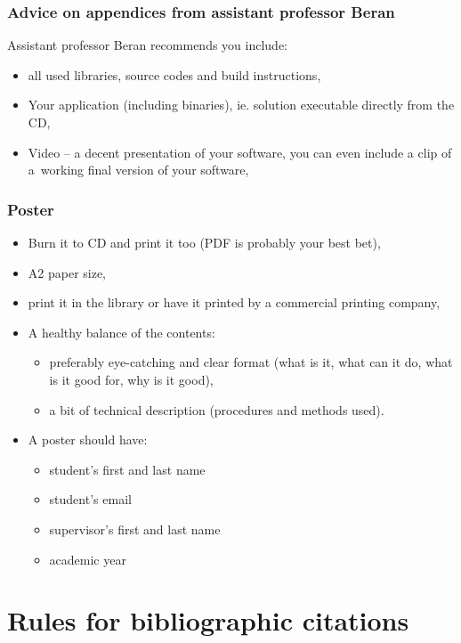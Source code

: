 \subsection{Advice on appendices from assistant professor Beran}

Assistant professor Beran recommends you include:
\begin{itemize}
  \item{all used libraries, source codes and build instructions,}
  \item{Your application (including binaries), ie. solution executable directly from the CD,}
  \item{Video -- a decent presentation of your software, you can even include a clip of a~working final version of your software,}
\end{itemize}

\subsection{Poster}
\begin{itemize}
  \item{Burn it to CD and print it too (PDF is probably your best bet),}
  \item{A2 paper size,}
  \item{print it in the library or have it printed by a commercial printing company,}
  \item{A healthy balance of the contents:
  \begin{itemize}
    \item{preferably eye-catching and clear format (what is it, what can it do, what is it good for, why is it good),}
    \item{a bit of technical description (procedures and methods used).}
  \end{itemize}}
  \item{A poster should have:}
  \begin{itemize}
  	\item{student's first and last name}
    \item{student's email}
    \item{supervisor's first and last name}
    \item{academic year}
  \end{itemize}
\end{itemize}

\chapter{Rules for bibliographic citations}
\label{citace}

